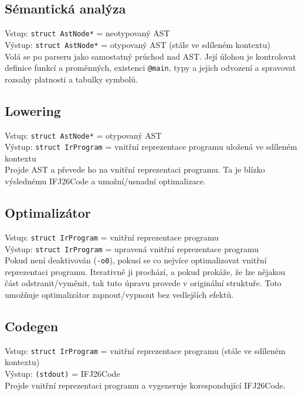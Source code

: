 \documentclass[11pt,a4paper]{article}
\begin{document}
\subsection{Sémantická analýza}
Vstup: \verb|struct AstNode*| = neotypovaný AST \\
Výstup: \verb|struct AstNode*| = otypovaný AST (stále ve sdíleném kontextu) \\
Volá se po parseru jako samostatný průchod nad AST. Její úlohou je kontrolovat definice funkcí a proměnných, existenci \verb|@main|, typy a jejich odvození a spravovat rozsahy platnosti a tabulky symbolů.

\subsection{Lowering}
Vstup: \verb|struct AstNode*| = otypovaný AST \\
Výstup: \verb|struct IrProgram| = vnitřní reprezentace programu uložená ve sdíleném kontextu \\
Projde AST a převede ho na vnitřní reprezentaci programu. Ta je blízko výslednému IFJ26Code a umožní/usnadní optimalizace.

\subsection{Optimalizátor}
Vstup: \verb|struct IrProgram| = vnitřní reprezentace programu \\
Výstup: \verb|struct IrProgram| = upravená vnitřní reprezentace programu \\
Pokud není deaktivován (\texttt{-o0}), pokusí se co nejvíce optimalizovat vnitřní reprezentaci programu. Iterativně ji prochází, a pokud prokáže, že lze nějakou část odstranit/vyměnit, tak tuto úpravu provede v originální struktuře. Toto umožňuje optimalizátor zapnout/vypnout bez vedlejších efektů.

\subsection{Codegen}
Vstup: \verb|struct IrProgram| = vnitřní reprezentace programu (stále ve sdíleném kontextu) \\
Výstup: \verb|(stdout)| = IFJ26Code \\
Projde vnitřní reprezentaci programu a vygeneruje korespondující IFJ26Code.

\end{document}
